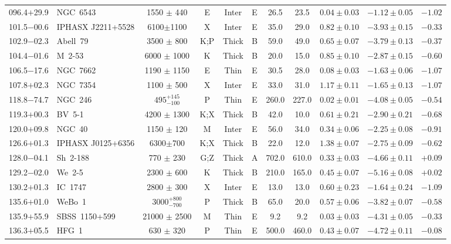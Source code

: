 \documentclass[useAMS]{mn2e}
\begin{document}
\begin{center}
{\begin{longtable}{llccccccccc}
096.4$+$29.9		&	NGC~6543	&	1550	$\pm$	440	&	E		&	Inter		&	E		&	26.5		&	23.5		&	$0.04 \pm 0.03$		&	$-1.12 \pm 0.05$		&	$-1.02$	\\
101.5$-$00.6		&	IPHASX J2211+5528	&	6100$\pm$1100		&	X		&	Inter		&	E		&	35.0		&	29.0		&	$0.82 \pm 0.10$		&	$-3.93 \pm 0.15$		&	$-0.33$	\\
102.9$-$02.3		&	Abell~79	&	3500	$\pm$	800	&	K;P		&	Thick		&	B		&	59.0		&	49.0		&	$0.65 \pm 0.07$		&	$-3.79 \pm 0.13$		&	$-0.37$	\\
104.4$-$01.6		&	M~2-53	&	6000	$\pm$	1000	&	K		&	Thick		&	B		&	20.0		&	15.0		&	$0.85 \pm 0.10$		&	$-2.87 \pm 0.15$		&     $-0.60$	\\
106.5$-$17.6		&	NGC~7662	&	1190	$\pm$	1150	&	E		&	Thin		&	E		&	30.5		&	28.0		&	$0.08 \pm 0.03$		&	$-1.63 \pm 0.06$		&	$-1.07$	\\
107.8$+$02.3		&	NGC~7354	&	1100	$\pm$	500	&	X		&	Inter		&	E		&	33.0		&	31.0		&	$1.17 \pm 0.11$		&	$-1.65 \pm 0.13$		&	$-1.07$	\\
118.8$-$74.7		&	NGC~246	&	$495^{+145}_{-100}$		&	P		&	Thin		&	E		&	260.0		&	227.0		&	$0.02 \pm 0.01$		&	$-4.08 \pm 0.05$		&	$-0.54$	\\
119.3$+$00.3		&	BV~5-1	&	4200	$\pm$	1300	&	K;X		&	Thick		&	B		&	42.0		&	10.0		&	$0.61 \pm 0.21$		&	$-2.90 \pm 0.21$		&	$-0.68$	\\
120.0$+$09.8		&	NGC~40	&	1150	$\pm$	120	&	M		&	Inter		&	E		&	56.0		&	34.0		&	$0.34 \pm 0.06$		&	$-2.25 \pm 0.08$		&	$-0.91$	\\
126.6$+$01.3		&	IPHASX J0125+6356	&	6300$\pm$700		&	K;X		&	Thick		&	B		&	22.0		&	12.0		&	$1.38 \pm 0.07$		&	$-2.75 \pm 0.09$		&	$-0.62$	\\
128.0$-$04.1		&	Sh~2-188	&	770	$\pm$	230	&	G;Z		&	Thick		&	A		&	702.0		&	610.0		&	$0.33 \pm 0.03$		&	$-4.66 \pm 0.11$		&	$+0.09$	\\
129.2$-$02.0		&	We~2-5	&	2300	$\pm$	600	&	K		&	Thick		&	B		&	210.0		&	165.0		&	$0.45 \pm 0.07$		&	$-5.16 \pm 0.08$		&	$+0.02$	\\
130.2$+$01.3		&	IC~1747	&	2800	$\pm$	300	&	X		&	Inter		&	E		&	13.0		&	13.0		&	$0.60 \pm 0.23$		&	$-1.64 \pm 0.24$		&	$-1.09$	\\
135.6$+$01.0		&	WeBo~1	&	$3000^{+800}_{-700}$		&	P		&	Thick		&	B		&	65.0		&	20.0		&	$0.57 \pm 0.06$		&	$-3.82 \pm 0.07$		&	$-0.58$	\\
135.9$+$55.9		&	SBSS~1150+599	&	21000	$\pm$	2500	&	M		&	Thin		&	E		&	9.2		&	9.2		&	$0.03 \pm 0.03$		&	$-4.31 \pm 0.05$		&	$-0.33$	\\
136.3$+$05.5		&	HFG~1	&	630	$\pm$	320	&	P		&	Thin		&	E		&	500.0		&	460.0		&	$0.43 \pm 0.07$		&	$-4.72 \pm 0.11$		&	$-0.08$	\\

\end{longtable}}
\end{center}
\end{document}
